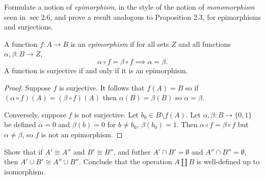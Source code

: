 \begin{tcolorbox}[title=Problem 5, breakable]   
    Formulate a notion of \emph{epimorphism}, in the style of the notion of 
    \emph{monomorphism} seen in $\sec 2.6$, and prove a result analogous to Proposition 2.3,
    for epimorphisms and surjections.
\end{tcolorbox}

\begin{theorem}
    A function $f : A \longrightarrow B$ is an \emph{epimorphism} if for all sets $Z$ 
    and all functions $\alpha, \beta : B \longrightarrow Z$,
    \[
        \alpha \circ f = \beta \circ f \implies \alpha = \beta.
    \]
    A function is surjective if and only if it is an epimorphism.
\end{theorem}

\begin{proof}
    Suppose $f$ is surjective.
    It follows that $f(A) = B$ so 
        if $(\alpha \circ f)(A) = (\beta \circ f)(A)$
        then $\alpha(B) = \beta(B)$ so $\alpha = \beta$.

    Conversely, suppose $f$ is not surjective.
    Let $b_0 \in B \setminus f(A)$. 
    Let $\alpha, \beta : B \longrightarrow \{0,1\}$ be defined $\alpha = 0$ and 
        $\beta(b) = 0$ for $b \neq b_0$, $\beta(b_0) = 1$. 
    Then $\alpha \circ f = \beta \circ f$ but $\alpha \neq \beta$, 
    so $f$ is not an epimorphism.
\end{proof}

\begin{tcolorbox}[title=Problem 9, breakable]   
    Show that if $A' \cong A''$ and $B' \cong B''$, and futher $A' \cap B' = \emptyset$
    and $A'' \cap B'' = \emptyset$, then $A' \cup B' \cong A'' \cup B''$. Conclude 
    that the operation $A \coprod B$ is well-defined up to isomorphism.
\end{tcolorbox}

